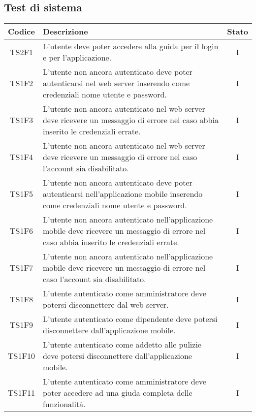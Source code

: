 	\subsection{Test di sistema}
	\begin{center}
		\begin{longtable}{|c|p{10cm}|c|}
			\hline
			\rowcolor{lighter-grayer}
			\textbf{Codice} & \textbf{Descrizione} & \textbf{Stato}  \\ 
						
			\hline
			\endhead
			
			\hline
			TS2F1 & L'utente deve poter accedere alla guida per il login e per l'applicazione. & I \\
			\hline
			TS1F2 &  L'utente non ancora autenticato deve poter autenticarsi nel web server inserendo come credenziali nome utente e password.  & I \\			
			\hline
			TS1F3 & L'utente non ancora autenticato nel web server deve ricevere un messaggio di errore nel caso abbia inserito le credenziali errate. & I \\			
			\hline
			TS1F4 & L'utente non ancora autenticato nel web server deve ricevere un messaggio di errore nel caso l'account sia disabilitato. & I \\			
			\hline
			TS1F5 & L'utente non ancora autenticato deve poter autenticarsi nell'applicazione mobile inserendo come credenziali nome utente e password. & I \\			
			\hline
			TS1F6 & L'utente non ancora autenticato nell'applicazione mobile deve ricevere un messaggio di errore nel caso abbia inserito le credenziali errate. & I \\			
			\hline
			TS1F7 & L'utente non ancora autenticato nell'applicazione mobile deve ricevere un messaggio di errore nel caso l'account sia disabilitato. & I \\			
			\hline
			TS1F8 & L'utente autenticato come amministratore deve potersi disconnettere dal web server. & I \\			
			\hline
			TS1F9 & L'utente autenticato come dipendente deve potersi disconnettere dall'applicazione mobile. & I \\			
			\hline			
			TS1F10 & L'utente autenticato come addetto alle pulizie deve potersi disconnettere dall'applicazione mobile. & I \\			
			\hline
			TS1F11 & L'utente autenticato come amministratore deve poter accedere ad una giuda completa delle funzionalità. & I \\		

\end{longtable}
\end{center}
